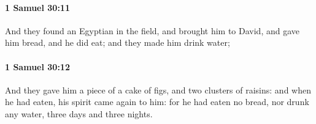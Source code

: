 		\paragraph{1 Samuel 30:11} %
			\label{1SAMUEL-30-11}

			And they found an Egyptian in the field, and brought him to David, and gave him bread, and he did eat; and they made him drink water;


		\paragraph{1 Samuel 30:12} %
			\label{1SAMUEL-30-12}

			And they gave him a piece of a cake of figs, and two clusters of raisins: and when he had eaten, his spirit came again to him: for he had eaten no bread, nor drunk any water, three days and three nights.


